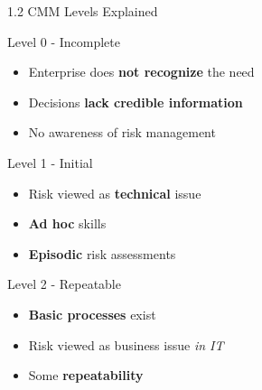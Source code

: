 \documentclass{beamer}
\begin{document}
	\begin{frame}{1.2 CMM Levels Explained}
		\begin{block}{Level 0 - Incomplete}
			\begin{itemize}
				\item Enterprise does \textbf{not recognize} the need
				\item Decisions \textbf{lack credible information}
				\item No awareness of risk management
			\end{itemize}
		\end{block}
		
		\begin{block}{Level 1 - Initial}
			\begin{itemize}
				\item Risk viewed as \textbf{technical} issue
				\item \textbf{Ad hoc} skills
				\item \textbf{Episodic} risk assessments
			\end{itemize}
		\end{block}
		
		\begin{block}{Level 2 - Repeatable}
			\begin{itemize}
				\item \textbf{Basic processes} exist
				\item Risk viewed as business issue \textit{in IT}
				\item Some \textbf{repeatability}
			\end{itemize}
		\end{block}
	\end{frame}
	
\end{document}

